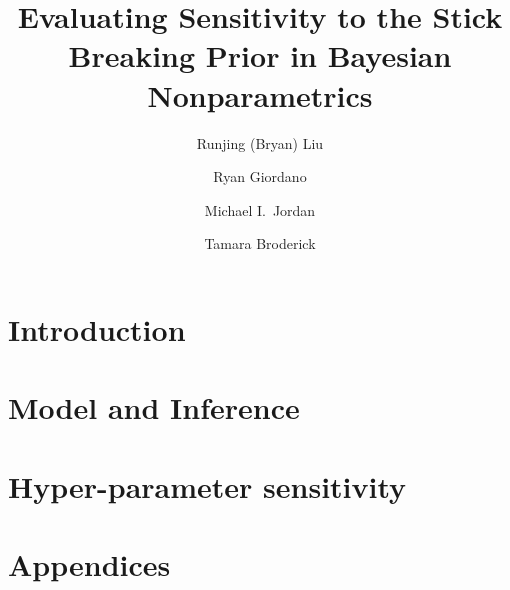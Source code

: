 \documentclass{article}
\title{Evaluating Sensitivity to the Stick Breaking Prior in Bayesian Nonparametrics}
\author[1*]{Runjing (Bryan) Liu}
\author[1*]{Ryan Giordano}
\author[1]{Michael I.~Jordan}
\author[2]{Tamara Broderick}
\affil[*]{These authors contributed equally}
\affil[1]{UC Berkeley}
\affil[2]{MIT}
\begin{document}
\maketitle

\section{Introduction}\label{sec:introduction}


\section{Model and Inference}\label{sec:model}




\section{Hyper-parameter sensitivity}\label{sec:hyper_param_sens}








% 



% 

\newpage



\newpage
\appendix
\section*{Appendices}

\end{document}
